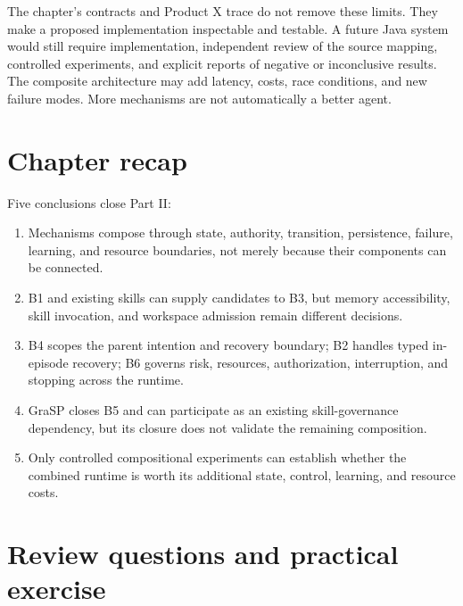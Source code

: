 The chapter's contracts and Product X trace do not remove these limits. They make a proposed implementation inspectable and testable. A future Java system would still require implementation, independent review of the source mapping, controlled experiments, and explicit reports of negative or inconclusive results. The composite architecture may add latency, costs, race conditions, and new failure modes. More mechanisms are not automatically a better agent.

\section{Chapter recap}
\label{sec:ch18-recap}

\begin{chapterrecap}
Five conclusions close Part II:
\begin{enumerate}
  \item Mechanisms compose through state, authority, transition, persistence, failure, learning, and resource boundaries, not merely because their components can be connected.
  \item B1 and existing skills can supply candidates to B3, but memory accessibility, skill invocation, and workspace admission remain different decisions.
  \item B4 scopes the parent intention and recovery boundary; B2 handles typed in-episode recovery; B6 governs risk, resources, authorization, interruption, and stopping across the runtime.
  \item GraSP closes B5 and can participate as an existing skill-governance dependency, but its closure does not validate the remaining composition.
  \item Only controlled compositional experiments can establish whether the combined runtime is worth its additional state, control, learning, and resource costs.
\end{enumerate}
\end{chapterrecap}

\section{Review questions and practical exercise}
\label{sec:ch18-review-questions}

